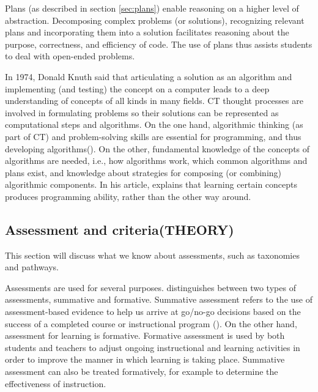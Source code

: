 Plans (as described in section \ref{sec:plans}) enable reasoning on a higher level of abstraction. Decomposing complex problems (or solutions), recognizing relevant plans and incorporating them into a solution facilitates reasoning about the purpose, correctness, and efficiency of code.  The use of plans thus assists students to deal with open-ended problems.

In 1974, Donald Knuth said that articulating a solution as an algorithm and implementing (and testing) the concept on a computer leads to a deep understanding of concepts of all kinds in many fields. CT thought processes are involved in formulating problems so their solutions can be represented as computational steps and algorithms\cite{aho2012computation}. On the one hand, algorithmic thinking (as part of CT) and problem-solving skills are essential for programming, and thus developing algorithms(\cite{McCracken2001}). On the other, fundamental knowledge of the concepts of algorithms are needed, i.e., how algorithms work, which common algorithms and plans exist, and knowledge about strategies for composing (or combining) algorithmic components\cite{deRaadt2008}. In his article,  explains that learning certain concepts produces programming ability, rather than the other way around.










\subsection{Assessment and criteria(THEORY)}
This section will discuss what we know about assessments, such as taxonomies and pathways.


Assessments are used for several purposes.  distinguishes between two types of assessments, summative and formative. Summative assessment refers to the use of assessment-based evidence to help us arrive at go/no-go decisions based on the success of a completed course or instructional program (\cite{popham2009assessment}). On the other hand, assessment for learning is formative. Formative assessment is used by both students and teachers to adjust ongoing instructional and learning activities in order to improve the manner in which learning is taking place. Summative assessment can also be treated formatively, for example to determine the effectiveness of instruction.




